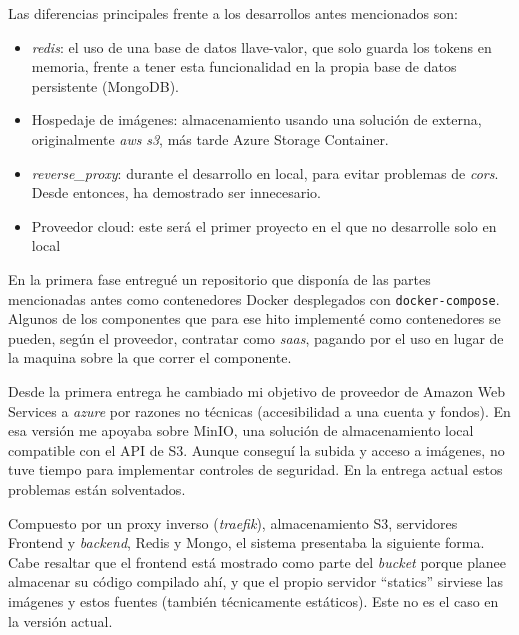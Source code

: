\documentclass[11pt]{article}
\begin{document}
\begin{flushleft}
Las diferencias principales frente a los desarrollos antes mencionados son: 

	\begin{itemize}
		\itemsep0em 
		\item \textit{\gls{redis}}: el uso de una base de datos llave-valor, que solo guarda los tokens en memoria, frente a tener esta funcionalidad en la propia base de datos persistente (MongoDB).
		\item Hospedaje de imágenes: almacenamiento usando una solución de externa, originalmente \textit{\acrshort{aws}} \textit{\acrshort{s3}}, más tarde Azure Storage Container.
		\item \textit{\gls{reverse_proxy}}: durante el desarrollo en local, para evitar problemas de \textit{\acrshort{cors}}. Desde entonces, ha demostrado ser innecesario.
		\item Proveedor cloud: este será el primer proyecto en el que no desarrolle solo en local
	\end{itemize}

\smallskip

En la primera fase entregué un repositorio que disponía de las partes mencionadas antes como contenedores Docker desplegados con \texttt{docker-compose}. Algunos de los componentes que para ese hito implementé como contenedores se pueden, según el proveedor, contratar como \textit{\acrlong{saas}}, pagando por el uso en lugar de la maquina sobre la que correr el componente.  
\linebreak

Desde la primera entrega he cambiado mi objetivo de proveedor de Amazon Web Services a \textit{\gls{azure}} por razones no técnicas (accesibilidad a una cuenta y fondos). En esa versión me apoyaba sobre MinIO, una solución de almacenamiento local compatible con el API de S3. Aunque conseguí la subida y acceso a imágenes, no tuve tiempo para implementar controles de seguridad. En la entrega actual estos problemas están solventados.
\linebreak



\clearpage
Compuesto por un proxy inverso (\textit{\gls{traefik}}), almacenamiento S3, servidores Frontend y \textit{\gls{backend}}, Redis y Mongo, el sistema presentaba la siguiente forma. Cabe resaltar que el frontend está mostrado como parte del \textit{\gls{bucket}} porque planee almacenar su código compilado ahí, y que el propio servidor  ``statics'' sirviese las imágenes y estos fuentes (también técnicamente estáticos). Este no es el caso en la versión actual.


\end{flushleft}
\end{document}
